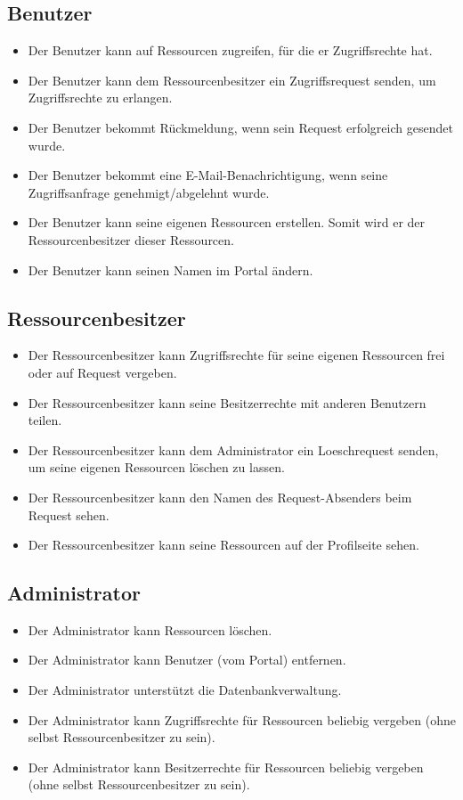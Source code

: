 \documentclass[parskip=full,11pt]{scrartcl}
\begin{document}
\subsection*{Benutzer}
\begin{itemize}[itemsep=0pt]
\item Der Benutzer kann auf Ressourcen zugreifen, für die er \gls{Zugriffsrechte} hat.
\item Der Benutzer kann dem Ressourcenbesitzer ein \gls{Zugriffsrequest} senden, um Zugriffsrechte zu erlangen.
\item Der Benutzer bekommt Rückmeldung, wenn sein Request erfolgreich gesendet wurde.
\item Der Benutzer bekommt eine E-Mail-Benachrichtigung, wenn seine Zugriffsanfrage genehmigt/abgelehnt wurde.
\item Der Benutzer kann seine eigenen Ressourcen erstellen. Somit wird er der Ressourcenbesitzer dieser Ressourcen.
\item Der Benutzer kann seinen Namen im Portal ändern.
\end{itemize}
 
\subsection*{Ressourcenbesitzer}
\begin{itemize}[itemsep=0pt]

\item Der Ressourcenbesitzer kann Zugriffsrechte für seine eigenen Ressourcen frei oder auf Request vergeben.
\item Der Ressourcenbesitzer kann seine \gls{Besitzerrechte} mit anderen Benutzern teilen.
\item Der Ressourcenbesitzer kann dem Administrator ein \gls{Loeschrequest} senden, um seine eigenen Ressourcen löschen zu lassen.
\item Der Ressourcenbesitzer kann den Namen des Request-Absenders beim Request sehen.
\item Der Ressourcenbesitzer kann seine Ressourcen auf der Profilseite sehen.
\end{itemize}
\newpage

\subsection*{Administrator}
\begin{itemize}[itemsep=0pt]
\item Der Administrator kann Ressourcen löschen.
\item Der Administrator kann Benutzer (vom Portal) entfernen.
\item Der Administrator unterstützt die Datenbankverwaltung.
\item Der Administrator kann Zugriffsrechte für Ressourcen beliebig vergeben (ohne selbst Ressourcenbesitzer zu sein).
\item Der Administrator kann Besitzerrechte für Ressourcen beliebig vergeben (ohne selbst Ressourcenbesitzer zu sein).
\end{itemize}
\end{document}
